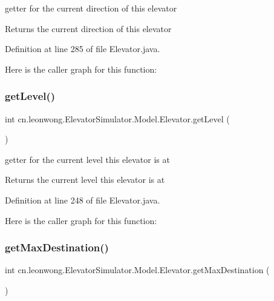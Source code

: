 getter for the current direction of this elevator \begin{DoxyReturn}{Returns}
the current direction of this elevator 
\end{DoxyReturn}


Definition at line 285 of file Elevator.\+java.

Here is the caller graph for this function\+:
\mbox{\label{classcn_1_1leonwong_1_1_elevator_simulator_1_1_model_1_1_elevator_a393eaa2daf4a00730685de6efb3893d5}} 
\subsubsection{\texorpdfstring{get\+Level()}{getLevel()}}
{\footnotesize\ttfamily int cn.\+leonwong.\+Elevator\+Simulator.\+Model.\+Elevator.\+get\+Level (\begin{DoxyParamCaption}{ }\end{DoxyParamCaption})}

getter for the current level this elevator is at \begin{DoxyReturn}{Returns}
the current level this elevator is at 
\end{DoxyReturn}


Definition at line 248 of file Elevator.\+java.

Here is the caller graph for this function\+:
\mbox{\label{classcn_1_1leonwong_1_1_elevator_simulator_1_1_model_1_1_elevator_acc5b1cdd5cefc853a1cd33e6e986b3a0}} 
\subsubsection{\texorpdfstring{get\+Max\+Destination()}{getMaxDestination()}}
{\footnotesize\ttfamily int cn.\+leonwong.\+Elevator\+Simulator.\+Model.\+Elevator.\+get\+Max\+Destination (\begin{DoxyParamCaption}{ }\end{DoxyParamCaption})}

